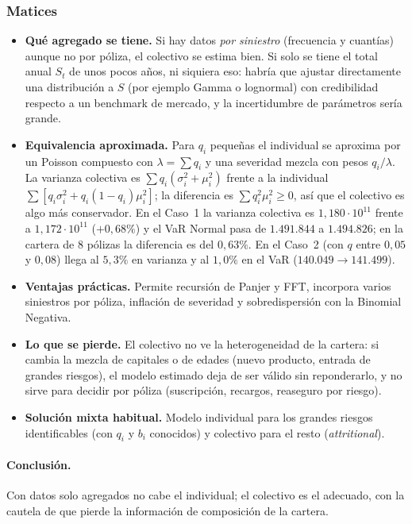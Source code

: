 \documentclass[a4paper,12pt]{article}
\begin{document}
\subsubsection*{Matices}
\begin{itemize}[leftmargin=*]
\item \textbf{Qu\'e agregado se tiene.} Si hay datos \emph{por siniestro} (frecuencia y cuant\'ias) aunque no por p\'oliza, el colectivo se estima bien. Si solo se tiene el total anual $S_t$ de unos pocos a\~nos, ni siquiera eso: habr\'ia que ajustar directamente una distribuci\'on a $S$ (por ejemplo Gamma o lognormal) con credibilidad respecto a un benchmark de mercado, y la incertidumbre de par\'ametros ser\'ia grande.
\item \textbf{Equivalencia aproximada.} Para $q_i$ peque\~nas el individual se aproxima por un Poisson compuesto con $\lambda=\sum q_i$ y una severidad mezcla con pesos $q_i/\lambda$. La varianza colectiva es $\sum q_i(\sigma_i^2+\mu_i^2)$ frente a la individual $\sum[q_i\sigma_i^2+q_i(1-q_i)\mu_i^2]$; la diferencia es $\sum q_i^2\mu_i^2\ge0$, as\'i que el colectivo es algo m\'as conservador. En el Caso~1 la varianza colectiva es $1{,}180\cdot10^{11}$ frente a $1{,}172\cdot10^{11}$ ($+0{,}68\%$) y el VaR Normal pasa de $1.491.844$ a $1.494.826$; en la cartera de 8 p\'olizas la diferencia es del $0{,}63\%$. En el Caso~2 (con $q$ entre $0{,}05$ y $0{,}08$) llega al $5{,}3\%$ en varianza y al $1{,}0\%$ en el VaR ($140.049\to141.499$).
\item \textbf{Ventajas pr\'acticas.} Permite recursi\'on de Panjer y FFT, incorpora varios siniestros por p\'oliza, inflaci\'on de severidad y sobredispersi\'on con la Binomial Negativa.
\item \textbf{Lo que se pierde.} El colectivo no ve la heterogeneidad de la cartera: si cambia la mezcla de capitales o de edades (nuevo producto, entrada de grandes riesgos), el modelo estimado deja de ser v\'alido sin reponderarlo, y no sirve para decidir por p\'oliza (suscripci\'on, recargos, reaseguro por riesgo).
\item \textbf{Soluci\'on mixta habitual.} Modelo individual para los grandes riesgos identificables (con $q_i$ y $b_i$ conocidos) y colectivo para el resto (\emph{attritional}).
\end{itemize}

\paragraph{Conclusi\'on.} Con datos solo agregados no cabe el individual; el colectivo es el adecuado, con la cautela de que pierde la informaci\'on de composici\'on de la cartera.
\end{document}
